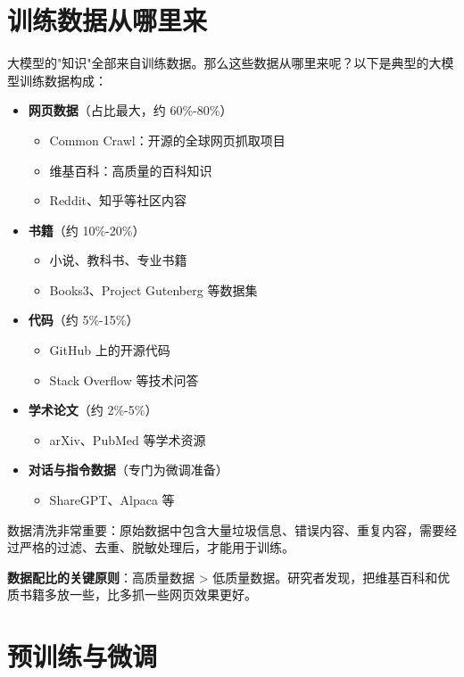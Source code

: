 \documentclass[12pt,UTF8]{ctexbook}
\begin{document}
\section{训练数据从哪里来}

大模型的"知识"全部来自训练数据。那么这些数据从哪里来呢？以下是典型的大模型训练数据构成：

\begin{itemize}
  \item \textbf{网页数据}（占比最大，约 60\%-80\%）
  \begin{itemize}
    \item Common Crawl：开源的全球网页抓取项目
    \item 维基百科：高质量的百科知识
    \item Reddit、知乎等社区内容
  \end{itemize}
  \item \textbf{书籍}（约 10\%-20\%）
  \begin{itemize}
    \item 小说、教科书、专业书籍
    \item Books3、Project Gutenberg 等数据集
  \end{itemize}
  \item \textbf{代码}（约 5\%-15\%）
  \begin{itemize}
    \item GitHub 上的开源代码
    \item Stack Overflow 等技术问答
  \end{itemize}
  \item \textbf{学术论文}（约 2\%-5\%）
  \begin{itemize}
    \item arXiv、PubMed 等学术资源
  \end{itemize}
  \item \textbf{对话与指令数据}（专门为微调准备）
  \begin{itemize}
    \item ShareGPT、Alpaca 等
  \end{itemize}
\end{itemize}

数据清洗非常重要：原始数据中包含大量垃圾信息、错误内容、重复内容，需要经过严格的过滤、去重、脱敏处理后，才能用于训练。

\textbf{数据配比的关键原则}：高质量数据 > 低质量数据。研究者发现，把维基百科和优质书籍多放一些，比多抓一些网页效果更好。

\section{预训练与微调}
\end{document}
